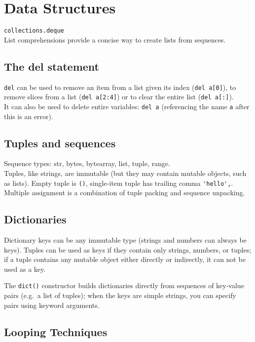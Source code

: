 \section{Data Structures}

\verb=collections.deque=\\
List comprehensions provide a concise way to create lists from sequences.

\subsection{The del statement}

\verb=del= can be used to remove an item from a list given its index
(\verb=del a[0]=),
to remove slices from a list (\verb=del a[2:4]=)
or to clear the entire list (\verb=del a[:]=).\\
It can also be used to delete entire variables: \verb=del a=
(referencing the name \verb=a= after this is an error).

\subsection{Tuples and sequences}

Sequence types: str, bytes, bytearray, list, tuple, range.\\
Tuples, like strings, are immutable
(but they may contain mutable objects, such as lists).
Empty tuple is \verb=()=, single-item tuple has trailing comma \verb='hello',=.
Multiple assignment is a combination of tuple packing and sequence unpacking.

\subsection{Dictionaries}

Dictionary keys can be any immutable type
(strings and numbers can always be keys).
Tuples can be used as keys if they contain only strings, numbers, or tuples;
if a tuple contains any mutable object either directly or indirectly,
it can not be used as a key.

The \verb=dict()= constructor builds dictionaries
directly from sequences of key-value pairs (e.g.\ a list of tuples);
when the keys are simple strings,
you can specify pairs using keyword arguments.

\subsection{Looping Techniques}

